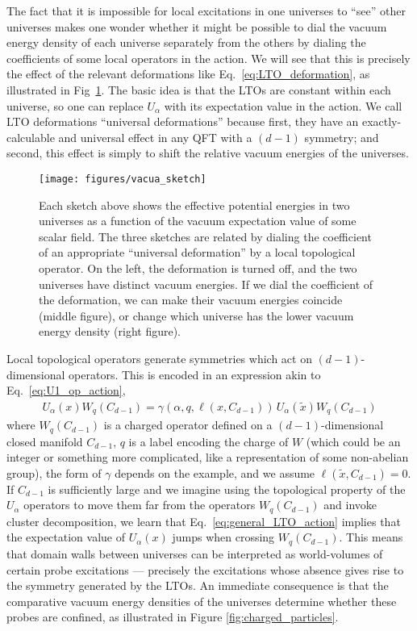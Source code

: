 \documentclass[11pt]{article}
\def\a{{\alpha}}
\begin{document}
The fact that it is impossible for local excitations in one universes to ``see''
other universes makes one wonder whether it might be possible to dial the vacuum
energy density of each universe separately from the others by dialing the coefficients of some local operators in the action.  We will see that
this is precisely the effect of the relevant deformations like
Eq.~\eqref{eq:LTO_deformation}, as illustrated in Fig~\ref{fig:level_crossing_intro}.  The basic idea 
is that the LTOs are constant within each universe, so one can replace $U_{\alpha}$ with its expectation value in the action.  We call  LTO deformations ``universal deformations'' because first, they have an exactly-calculable and universal effect in any QFT with a $(d-1)$ symmetry; and second, this effect is simply to shift the relative vacuum energies of the universes.

\begin{figure}[h]
    \centering
    \texttt{[image: figures/vacua\_sketch]}
    \caption{Each sketch above shows the effective potential
     energies in two universes as a function of the vacuum expectation value of some scalar field.   The three sketches are related by dialing the coefficient of an appropriate ``universal deformation'' by a local topological operator.
      On the left, the deformation is turned off, and the two universes have 
      distinct vacuum energies.  If we dial the coefficient of the deformation, we can make their 
      vacuum energies coincide (middle figure), or change which universe 
      has the lower vacuum energy density (right figure).} 
    \label{fig:level_crossing_intro} 
\end{figure}

Local topological operators generate symmetries which act on
$(d-1)$-dimensional operators.  This is encoded in an expression akin to Eq.~\eqref{eq:U1_op_action},
\begin{align}
    U_{\a}(x) W_{q}(C_{d-1}) = \gamma(\a,q,\mathcal{\ell}(x, C_{d-1})) \,  U_{\a}(\tilde{x})  W_{q}(C_{d-1}) 
    \label{eq:general_LTO_action}
\end{align}
where  $W_q(C_{d-1})$ is a charged operator defined on a $(d-1)$-dimensional
closed manifold $C_{d-1}$, $q$ is a label encoding the charge of $W$ (which
could be an integer or something more complicated, like a representation of
some non-abelian group), the form of $\gamma$ depends on the example, and
we assume $\ell(\tilde{x}, C_{d-1}) = 0$. If $C_{d-1}$ is sufficiently large and we imagine using the topological
property of the $U_{\alpha}$ operators to move them far from the
operators $W_q(C_{d-1})$ and invoke cluster decomposition, we learn that
Eq.~\eqref{eq:general_LTO_action} implies that the expectation value of
$U_{\alpha}(x)$ jumps when crossing $W_q(C_{d-1})$.  This means that domain
walls  between universes can be interpreted as world-volumes of certain probe
excitations --- precisely the excitations whose absence gives rise to the symmetry generated by the LTOs.  An immediate consequence is that the comparative vacuum energy densities of the
universes determine whether these probes are confined, as illustrated in
Figure \ref{fig:charged_particles}.
\end{document}
